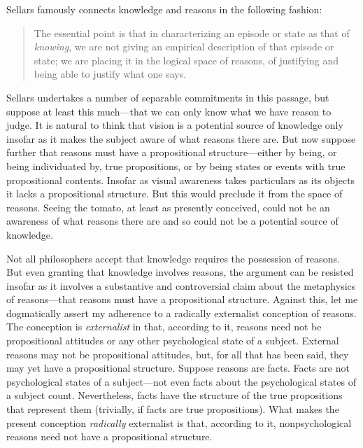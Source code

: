 \documentclass[12pt]{article}
\begin{document}
Sellars famously connects knowledge and reasons in the following fashion:
\begin{quote}
	The essential point is that in characterizing an episode or state as that of \emph{knowing}, we are not giving an empirical description of that episode or state; we are placing it in the logical space of reasons, of justifying and being able to justify what one says.
\end{quote}
Sellars undertakes a number of separable commitments in this passage, but suppose at least this much---that we can only know what we have reason to judge. It is natural to think that vision is a potential source of knowledge only insofar as it makes the subject aware of what reasons there are. But now suppose further that reasons must have a propositional structure---either by being, or being individuated by, true propositions, or by being states or events with true propositional contents. Insofar as visual awareness takes particulars as its objects it lacks a propositional structure. But this would preclude it from the space of reasons. Seeing the tomato, at least as presently conceived, could not be an awareness of what reasons there are and so could not be a potential source of knowledge.

Not all philosophers accept that knowledge requires the possession of reasons. But even granting that knowledge involves reasons, the argument can be resisted insofar as it involves a substantive and controversial claim about the metaphysics of reasons---that reasons must have a propositional structure. Against this, let me dogmatically assert my adherence to a radically externalist conception of reasons. The conception is \emph{externalist} in that, according to it, reasons need not be propositional attitudes or any other psychological state of a subject. External reasons may not be propositional attitudes, but, for all that has been said, they may yet have a propositional structure. Suppose reasons are facts. Facts are not psychological states of a subject---not even facts about the psychological states of a subject count. Nevertheless, facts have the structure of the true propositions that represent them (trivially, if facts are true propositions). What makes the present conception \emph{radically} externalist is that, according to it, nonpsychological reasons need not have a propositional structure.
\end{document}
